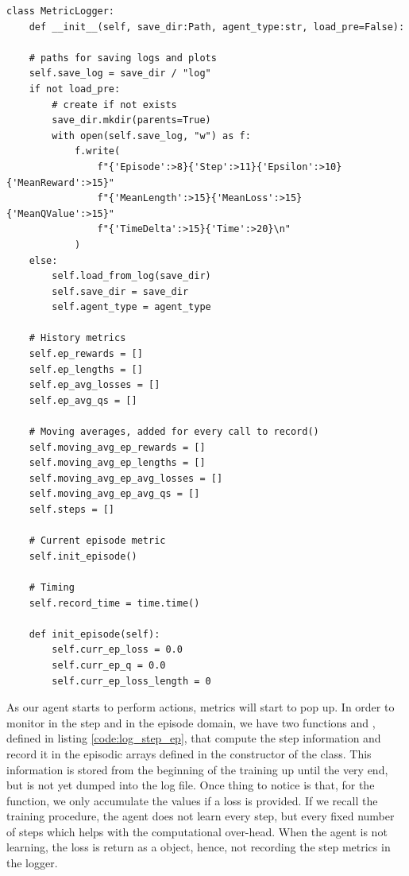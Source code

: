 \begin{lstlisting}[caption={MetricLogger class initialization}, label={code:metric_logger_class}]
class MetricLogger:
	def __init__(self, save_dir:Path, agent_type:str, load_pre=False):
	
	# paths for saving logs and plots
	self.save_log = save_dir / "log"
	if not load_pre:
		# create if not exists
		save_dir.mkdir(parents=True)
		with open(self.save_log, "w") as f:
			f.write(
				f"{'Episode':>8}{'Step':>11}{'Epsilon':>10}{'MeanReward':>15}"
				f"{'MeanLength':>15}{'MeanLoss':>15}{'MeanQValue':>15}"
				f"{'TimeDelta':>15}{'Time':>20}\n"
			)
	else:
		self.load_from_log(save_dir)
		self.save_dir = save_dir
		self.agent_type = agent_type
		
	# History metrics
	self.ep_rewards = []
	self.ep_lengths = []
	self.ep_avg_losses = []
	self.ep_avg_qs = []
	
	# Moving averages, added for every call to record()
	self.moving_avg_ep_rewards = []
	self.moving_avg_ep_lengths = []
	self.moving_avg_ep_avg_losses = []
	self.moving_avg_ep_avg_qs = []
	self.steps = []
	
	# Current episode metric
	self.init_episode()
	
	# Timing
	self.record_time = time.time()
	
	def init_episode(self):
		self.curr_ep_loss = 0.0
		self.curr_ep_q = 0.0
		self.curr_ep_loss_length = 0
\end{lstlisting}

As our agent starts to perform actions, metrics will start to pop up. In order to monitor in the step and in the episode domain, we have two functions  and , defined in listing \ref{code:log_step_ep}, that compute the step information and record it in the episodic arrays defined in the constructor of the class. This information is stored from the beginning of the training up until the very end, but is not yet dumped into the log file. Once thing to notice is that, for the  function, we only accumulate the values if a loss is provided. If we recall the training procedure, the agent does not learn every step, but every fixed number of steps which helps with the computational over-head. When the agent is not learning, the loss is return as a  object, hence, not recording the step metrics in the logger.

